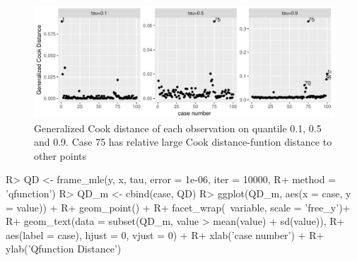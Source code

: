 \documentclass[article]{jss}
\theoremstyle{definition}
\theoremstyle{definition}
\theoremstyle{remark}
\begin{document}
\begin{CodeChunk}

\begin{figure}

{\centering \includegraphics{Diagnosing_outliers_and_visualization_of_quantile_regression_models_files/figure-latex/unnamed-chunk-5-1} 

}

\caption[Generalized Cook distance of each observation on quantile 0.1, 0.5 and 0.9]{Generalized Cook distance of each observation on quantile 0.1, 0.5 and 0.9. Case 75 has relative large Cook distance-funtion distance to other points}\label{fig:unnamed-chunk-5}
\end{figure}
\end{CodeChunk}\begin{CodeChunk}

\begin{CodeInput}
R> QD <- frame_mle(y, x, tau, error = 1e-06, iter = 10000,
R+                method = 'qfunction')
R> QD_m <- cbind(case, QD)
R> ggplot(QD_m, aes(x = case, y = value)) +
R+  geom_point() +
R+  facet_wrap(~variable, scale = 'free_y')+
R+  geom_text(data = subset(QD_m, value > mean(value) + sd(value)),
R+            aes(label = case), hjust = 0, vjust = 0) +
R+  xlab('case number') +
R+  ylab('Qfunction Distance')
\end{CodeInput}
\begin{figure}


\end{figure}
\end{CodeChunk}
\end{document}
